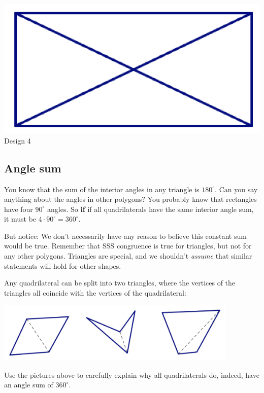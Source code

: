 \begin{center}
\bigskip

\includegraphics[scale=0.6]{design4} \\
Design 4


\end{center}

\newpage

\subsection{Angle sum}
You know that the sum of the interior angles in any triangle is $180^\circ$.  Can you say anything about the angles in other polygons?  
You probably know that rectangles have four $90^\circ$ angles.  So {\bf if} if all quadrilaterals have the same interior angle sum, it must be $4 \cdot 90^\circ = 360^\circ$.  

But notice: We don't necessarily have any reason to believe this constant sum would be true.  Remember that SSS congruence is true for triangles, but not for any other polygons.  Triangles are special, and we shouldn't \emph{assume} that similar statements will hold for other shapes.


\bigskip
\bigskip

\begin{thinkpair*}
Any quadrilateral can be split into two triangles, where the vertices of the triangles all coincide with the vertices of the quadrilateral:

\begin{center}
\includegraphics[height=2.9cm]{splitquads}
\end{center}
Use the pictures above to carefully explain why all quadrilaterals do, indeed, have an angle sum of $360^\circ$.

\end{thinkpair*}


